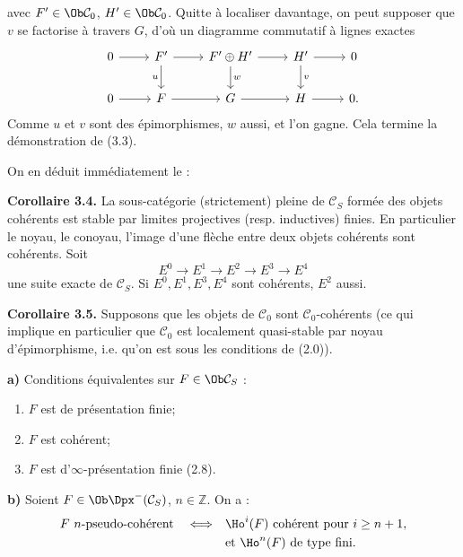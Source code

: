 avec \(F'\in\Ob\mathcal C_0\), \(H'\in\Ob\mathcal C_0\). Quitte à localiser davantage, on peut supposer que \(v\) se factorise à travers \(G\), d'où un diagramme commutatif à lignes exactes
\[
\begin{tikzcd}
0\arrow[r]&F'\arrow[r]\arrow[d,"u"']&F'\oplus H'\arrow[r]\arrow[d,"w"]&H'\arrow[r]\arrow[d,"v"]&0\\
0\arrow[r]&F\arrow[r]&G\arrow[r]&H\arrow[r]&0 .
\end{tikzcd}
\]
Comme \(u\) et \(v\) sont des épimorphismes, \(w\) aussi, et l'on gagne. Cela termine la démonstration de (3.3).

On en déduit immédiatement le :

\textbf{Corollaire 3.4.} La sous-catégorie (strictement) pleine de \(\mathcal C_S\) formée des objets cohérents est stable par limites projectives (resp. inductives) finies. En particulier le noyau, le conoyau, l'image d'une flèche entre deux objets cohérents sont cohérents. Soit
\[
  E^0\longrightarrow E^1\longrightarrow E^2\longrightarrow E^3\longrightarrow E^4
\]
une suite exacte de \(\mathcal C_S\). Si \(E^0,E^1,E^3,E^4\) sont cohérents, \(E^2\) aussi.

\textbf{Corollaire 3.5.} Supposons que les objets de \(\mathcal C_0\) sont \(\mathcal C_0\)-cohérents (ce qui implique en particulier que \(\mathcal C_0\) est localement quasi-stable par noyau d'épimorphisme, i.e. qu'on est sous les conditions de (2.0)).

\textbf{a)} Conditions équivalentes sur \(F\in\Ob\mathcal C_S\) :
\begin{enumerate}[label=(\roman*)]
\item \(F\) est de présentation finie;
\item \(F\) est cohérent;
\item \(F\) est d'\(\infty\)-présentation finie (2.8).
\end{enumerate}

\textbf{b)} Soient \(F\in\Ob\Dpx^-(\mathcal C_S)\), \(n\in\mathbb Z\). On a :
\[
\begin{split}
F\ n\text{-pseudo-cohérent}
\quad\Longleftrightarrow\quad&
\Ho^i(F)\text{ cohérent pour }i\geq n+1,\\
&\text{et }\Ho^n(F)\text{ de type fini.}
\end{split}
\]
